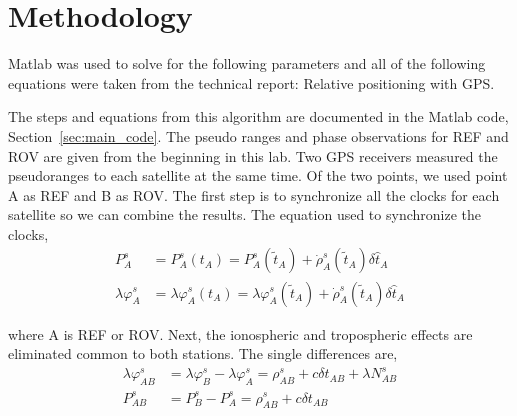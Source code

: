 

\section{Methodology} 

\label{sec:methodology}

Matlab was used to solve for the following parameters and all of the following equations were taken from the technical report: Relative positioning with GPS.\cite{milanGPS} 

The steps and equations from this algorithm are documented in the Matlab code, Section~\ref{sec:main_code}. The pseudo ranges and phase observations for REF and ROV are given from the beginning in this lab. Two GPS receivers measured the pseudoranges to each satellite at the same time. Of the two points, we used point A as REF and B as ROV. The first step is to synchronize all the clocks for each satellite so we can combine the results. The equation used to synchronize the clocks, 
\begin{align}
	P_A^s &= P_A^s(t_A) = P_A^s(\tilde{t}_A) + \dot{\rho}_A^s(\tilde{t}_A)\delta \hat{t}_A \label{eq:14a} \\
	\lambda \varphi_A^s &= \lambda \varphi_A^s(t_A) = \lambda \varphi_A^s(\tilde{t}_A) + \dot{\rho}_A^s(\tilde{t}_A)\delta \hat{t}_A \label{eq:14b} 
\end{align}

where A is REF or ROV. Next, the ionospheric and tropospheric effects are eliminated common to both stations. The single differences are, 
\begin{align}
	\lambda \varphi_{AB}^s &= \lambda \varphi_{B}^s - \lambda \varphi_{A}^s = \rho_{AB}^s + c \delta t_{AB} + \lambda N_{AB}^s \label{eq:15a} \\
	P_{AB}^s &= P_B^s - P_A^s = \rho_{AB}^s + c \delta t_{AB} \label{eq:15b} 
\end{align}

